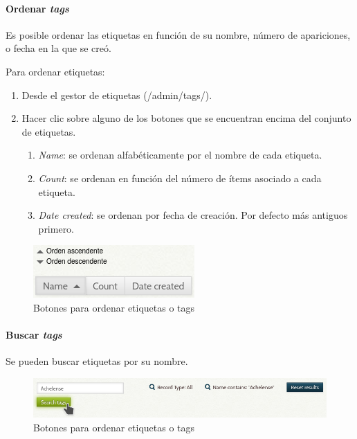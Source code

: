 \documentclass[
]{article}
\providecommand{\tightlist}{%
  \setlength{\itemsep}{0pt}\setlength{\parskip}{0pt}}
\begin{document}
\hypertarget{ordenar-tags}{%
\paragraph{\texorpdfstring{Ordenar
\emph{tags}}{Ordenar tags}}\label{ordenar-tags}}

Es posible ordenar las etiquetas en función de su nombre, número de
apariciones, o fecha en la que se creó.

Para ordenar etiquetas:

\begin{enumerate}
\def\labelenumi{\arabic{enumi}.}
\tightlist
\item
  Desde el gestor de etiquetas ({/admin/tags/}).
\item
  Hacer clic sobre alguno de los botones que se encuentran encima del
  conjunto de etiquetas.

  \begin{enumerate}
  \def\labelenumii{\alph{enumii}.}
  \tightlist
  \item
    \emph{Name}: se ordenan alfabéticamente por el nombre de cada
    etiqueta.
  \item
    \emph{Count}: se ordenan en función del número de ítems asociado a
    cada etiqueta.
  \item
    \emph{Date created}: se ordenan por fecha de creación. Por defecto
    más antiguos primero.
  \end{enumerate}
\end{enumerate}

\begin{figure}
\hypertarget{tags-order-buttons}{%
\centering
\includegraphics{../_static/images/tags-order-buttons.png}
\caption{Botones para ordenar etiquetas o
tags}\label{tags-order-buttons}
}
\end{figure}

\hypertarget{buscar-tags}{%
\paragraph{\texorpdfstring{Buscar
\emph{tags}}{Buscar tags}}\label{buscar-tags}}

Se pueden buscar etiquetas por su nombre.

\begin{figure}
\hypertarget{tags-search}{%
\centering
\includegraphics{../_static/images/tags-search.png}
\caption{Botones para ordenar etiquetas o tags}\label{tags-search}
}
\end{figure}
\end{document}
